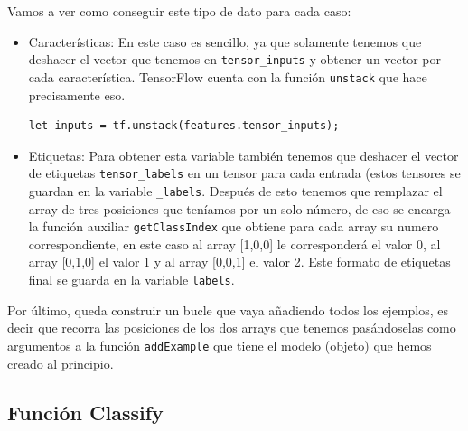 \documentclass[a4paper, 12pt]{book}
\begin{document}
Vamos a ver como conseguir este tipo de dato para cada caso:

\begin{itemize}
	\item Características: En este caso es sencillo, ya que solamente tenemos que deshacer el vector que tenemos en \texttt{tensor\_inputs} y obtener un vector por cada característica. TensorFlow cuenta con la función \texttt{unstack} que hace precisamente eso.
\begin{verbatim}
let inputs = tf.unstack(features.tensor_inputs);
\end{verbatim}	
	\item Etiquetas: Para obtener esta variable también tenemos que deshacer el vector de etiquetas \texttt{tensor\_labels} en un tensor para cada entrada (estos tensores se guardan en la variable \texttt{\_labels}. Después de esto tenemos que remplazar el array de tres posiciones que teníamos por un solo número, de eso se encarga la función auxiliar  \texttt{getClassIndex} que obtiene para cada array su numero correspondiente, en este caso al array [1,0,0] le corresponderá el valor 0, al array [0,1,0] el valor 1 y al array [0,0,1] el valor 2. Este formato de etiquetas final se guarda en la variable \texttt{labels}.
\end{itemize}

Por último, queda construir un bucle que vaya añadiendo todos los ejemplos, es decir que recorra las posiciones de los dos arrays que tenemos pasándoselas como argumentos a la función \texttt{addExample} que tiene el modelo (objeto) que hemos creado al principio.

\subsection{Función Classify} 
\label{sec:funcionclassifyknn}
\end{document}
